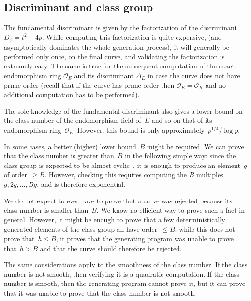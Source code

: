 \documentclass[twocolumn,letterpaper,10pt]{article}
\let\ro\mathcal
\begin{document}
\subsection{Discriminant and class group}

The fundamental discriminant is given by
the factorization of the discriminant~$D_\phi = t^2 - 4 p$.
While computing this factorization is quite expensive,
(and asymptotically dominates the whole generation process),
it will generally be performed only once, on the final curve,
and validating the factorization is extremely easy.
The same is true for the subsequent computation of the exact endomorphism
ring $\ro O_E$ and its discriminant $\Delta_E$
in case the curve does not have prime order
(recall that if the curve has prime order then $\ro O_E = \ro O_K$
and no additional computation has to be performed).

\smallskip

The sole knowledge of the fundamental discriminant also gives a lower bound
on the class number of the endomorphism field of~$E$
and so on that of its endomorphism ring~$\ro O_E$.
However, this bound is only approximately~$p^{1/4}/\log p$.

In some cases, a better (higher) lower bound~$B$ might be required.
We can prove that the class number is greater than~$B$
in the following simple way:
since the class group is expected to be almost cyclic~\cite{nt1984cl},
it is enough to produce an element~$g$ of order~$≥ B$.
However, checking this requires
computing the $B$ multiples~$g, 2g, …, B g$,
and is therefore exponential.

We do not expect to ever have to prove that a curve was rejected
because its class number is smaller than~$B$.
We know no efficient way to prove such a fact in general.
However, it might be enough to prove
that a few deterministically generated elements of the class group
all have order~$≤ B$:
while this does not prove that~$h ≤ B$,
it proves that the generating program was unable to prove that~$h > B$
and that the curve should therefore be rejected.

\smallskip

The same considerations apply to the smoothness of the class number.
If the class number is not smooth, then
verifying it is a quadratic computation.
If the class number is smooth, then
the generating program cannot prove it,
but it can prove that it was unable to prove that
the class number is not smooth.



\end{document}
